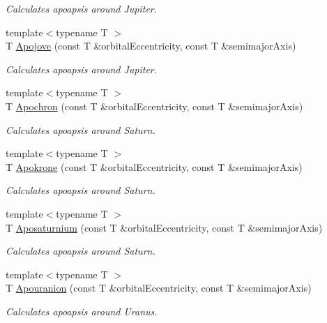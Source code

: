 \begin{DoxyCompactItemize}
\begin{DoxyCompactList}\small\item\em Calculates apoapsis around Jupiter. \end{DoxyCompactList}\item 
{\footnotesize template$<$typename T $>$ }\\T \hyperlink{group___apoapsis_ga5a45d0a873514113aaa0adc95aefbbde}{Apojove} (const T \&orbital\+Eccentricity, const T \&semimajor\+Axis)
\begin{DoxyCompactList}\small\item\em Calculates apoapsis around Jupiter. \end{DoxyCompactList}\item 
{\footnotesize template$<$typename T $>$ }\\T \hyperlink{group___apoapsis_gae4ea146039e6f32022321f0998e715e8}{Apochron} (const T \&orbital\+Eccentricity, const T \&semimajor\+Axis)
\begin{DoxyCompactList}\small\item\em Calculates apoapsis around Saturn. \end{DoxyCompactList}\item 
{\footnotesize template$<$typename T $>$ }\\T \hyperlink{group___apoapsis_ga98557a8d49aa129c29e652c4758334d1}{Apokrone} (const T \&orbital\+Eccentricity, const T \&semimajor\+Axis)
\begin{DoxyCompactList}\small\item\em Calculates apoapsis around Saturn. \end{DoxyCompactList}\item 
{\footnotesize template$<$typename T $>$ }\\T \hyperlink{group___apoapsis_gac157adc20a88c8616e4822eb819f9016}{Aposaturnium} (const T \&orbital\+Eccentricity, const T \&semimajor\+Axis)
\begin{DoxyCompactList}\small\item\em Calculates apoapsis around Saturn. \end{DoxyCompactList}\item 
{\footnotesize template$<$typename T $>$ }\\T \hyperlink{group___apoapsis_ga6efaf5c9379f1085fa6e51bf97356124}{Apouranion} (const T \&orbital\+Eccentricity, const T \&semimajor\+Axis)
\begin{DoxyCompactList}\small\item\em Calculates apoapsis around Uranus. \end{DoxyCompactList}\item 

\end{DoxyCompactItemize}
